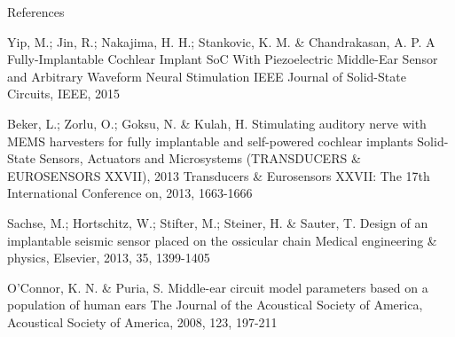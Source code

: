 \documentclass[dvipsnames,12pt]{beamer}
\begin{document}
\begin{frame}[allowframebreaks]{References}
\begin{thebibliography}{5}
\begin{footnotesize}
\begin{justifying}
Yip, M.; Jin, R.; Nakajima, H. H.; Stankovic, K. M. \& Chandrakasan, A. P. A Fully-Implantable Cochlear Implant SoC With Piezoelectric Middle-Ear Sensor and Arbitrary Waveform Neural Stimulation IEEE Journal of Solid-State Circuits, IEEE, 2015

Beker, L.; Zorlu, O.; Goksu, N. \& Kulah, H. Stimulating auditory nerve with MEMS harvesters for fully implantable and self-powered cochlear implants Solid-State Sensors, Actuators and Microsystems (TRANSDUCERS \& EUROSENSORS XXVII), 2013 Transducers \& Eurosensors XXVII: The 17th International Conference on, 2013, 1663-1666

Sachse, M.; Hortschitz, W.; Stifter, M.; Steiner, H. \& Sauter, T. Design of an implantable seismic sensor placed on the ossicular chain Medical engineering \& physics, Elsevier, 2013, 35, 1399-1405


O'Connor, K. N. \& Puria, S. Middle-ear circuit model parameters based on a population of human ears The Journal of the Acoustical Society of America, Acoustical Society of America, 2008, 123, 197-211

\end{justifying}

\end{footnotesize}

\end{thebibliography}

\end{frame}
\end{document}
